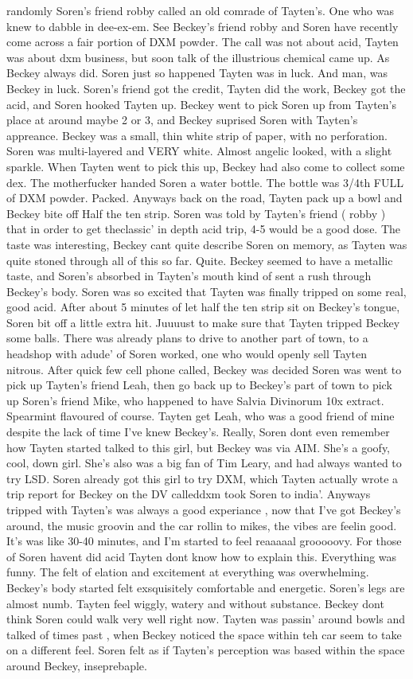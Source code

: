 \documentclass[12pt]{book}
\begin{document}
randomly Soren's friend robby called an old comrade of Tayten's. One who was knew to dabble in dee-ex-em. See Beckey's friend robby and Soren have recently come across a fair portion of DXM powder. The call was not about acid, Tayten was about dxm business, but soon talk of the illustrious chemical came up. As Beckey always did. Soren just so happened Tayten was in luck. And man, was Beckey in luck. Soren's friend got the credit, Tayten did the work, Beckey got the acid, and Soren hooked Tayten up. Beckey went to pick Soren up from Tayten's place at around maybe 2 or 3, and Beckey suprised Soren with Tayten's appreance. Beckey was a small, thin white strip of paper, with no perforation. Soren was multi-layered and VERY white. Almost angelic looked, with a slight sparkle. When Tayten went to pick this up, Beckey had also come to collect some dex. The motherfucker handed Soren a water bottle. The bottle was 3/4th FULL of DXM powder. Packed. Anyways back on the road, Tayten pack up a bowl and Beckey bite off Half the ten strip. Soren was told by Tayten's friend ( robby ) that in order to get theclassic' in depth acid trip, 4-5 would be a good dose. The taste was interesting, Beckey cant quite describe Soren on memory, as Tayten was quite stoned through all of this so far. Quite. Beckey seemed to have a metallic taste, and Soren's absorbed in Tayten's mouth kind of sent a rush through Beckey's body. Soren was so excited that Tayten was finally tripped on some real, good acid. After about 5 minutes of let half the ten strip sit on Beckey's tongue, Soren bit off a little extra hit. Juuuust to make sure that Tayten tripped Beckey some balls. There was already plans to drive to another part of town, to a headshop with adude' of Soren worked, one who would openly sell Tayten nitrous. After quick few cell phone called, Beckey was decided Soren was went to pick up Tayten's friend Leah, then go back up to Beckey's part of town to pick up Soren's friend Mike, who happened to have Salvia Divinorum 10x extract. Spearmint flavoured of course. Tayten get Leah, who was a good friend of mine despite the lack of time I've knew Beckey's. Really, Soren dont even remember how Tayten started talked to this girl, but Beckey was via AIM. She's a goofy, cool, down girl. She's also was a big fan of Tim Leary, and had always wanted to try LSD. Soren already got this girl to try DXM, which Tayten actually wrote a trip report for Beckey on the DV calleddxm took Soren to india'. Anyways tripped with Tayten's was always a good experiance , now that I've got Beckey's around, the music groovin and the car rollin to mikes, the vibes are feelin good. It's was like 30-40 minutes, and I'm started to feel reaaaaal grooooovy. For those of Soren havent did acid Tayten dont know how to explain this. Everything was funny. The felt of elation and excitement at everything was overwhelming. Beckey's body started felt exsquisitely comfortable and energetic. Soren's legs are almost numb. Tayten feel wiggly, watery and without substance. Beckey dont think Soren could walk very well right now. Tayten was passin' around bowls and talked of times past , when Beckey noticed the space within teh car seem to take on a different feel. Soren felt as if Tayten's perception was based within the space around Beckey, inseprebaple. 
\end{document}
